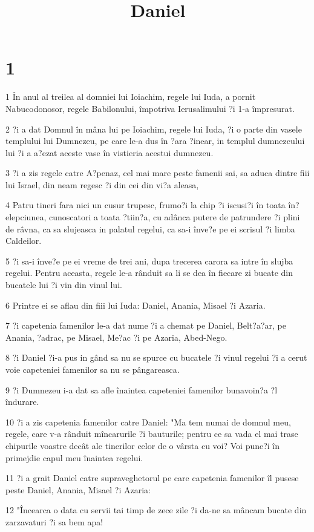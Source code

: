 

\title{Daniel}


\chapter{1}

\par 1 În anul al treilea al domniei lui Ioiachim, regele lui Iuda, a pornit Nabucodonosor, regele Babilonului, împotriva Ierusalimului ?i 1-a împresurat.
\par 2 ?i a dat Domnul în mâna lui pe Ioiachim, regele lui Iuda, ?i o parte din vasele templului lui Dumnezeu, pe care le-a dus în ?ara ?inear, in templul dumnezeului lui ?i a a?ezat aceste vase în vistieria acestui dumnezeu.
\par 3 ?i a zis regele catre A?penaz, cel mai mare peste famenii sai, sa aduca dintre fiii lui Israel, din neam regesc ?i din cei din vi?a aleasa,
\par 4 Patru tineri fara nici un cusur trupesc, frumo?i la chip ?i iscusi?i în toata în?elepciunea, cunoscatori a toata ?tiin?a, cu adânca putere de patrundere ?i plini de râvna, ca sa slujeasca in palatul regelui, ca sa-i înve?e pe ei scrisul ?i limba Caldeilor.
\par 5 ?i sa-i înve?e pe ei vreme de trei ani, dupa trecerea carora sa intre în slujba regelui. Pentru aceasta, regele le-a rânduit sa li se dea în fiecare zi bucate din bucatele lui ?i vin din vinul lui.
\par 6 Printre ei se aflau din fiii lui Iuda: Daniel, Anania, Misael ?i Azaria.
\par 7 ?i capetenia famenilor le-a dat nume ?i a chemat pe Daniel, Belt?a?ar, pe Anania, ?adrac, pe Misael, Me?ac ?i pe Azaria, Abed-Nego.
\par 8 ?i Daniel ?i-a pus in gând sa nu se spurce cu bucatele ?i vinul regelui ?i a cerut voie capeteniei famenilor sa nu se pângareasca.
\par 9 ?i Dumnezeu i-a dat sa afle înaintea capeteniei famenilor bunavoin?a ?l îndurare.
\par 10 ?i a zis capetenia famenilor catre Daniel: "Ma tem numai de domnul meu, regele, care v-a rânduit mîncarurile ?i bauturile; pentru ce sa vada el mai trase chipurile voastre decât ale tinerilor celor de o vârsta cu voi? Voi pune?i în primejdie capul meu înaintea regelui.
\par 11 ?i a grait Daniel catre supraveghetorul pe care capetenia famenilor îl pusese peste Daniel, Anania, Misael ?i Azaria:
\par 12 "Încearca o data cu servii tai timp de zece zile ?i da-ne sa mâncam bucate din zarzavaturi ?i sa bem apa!
